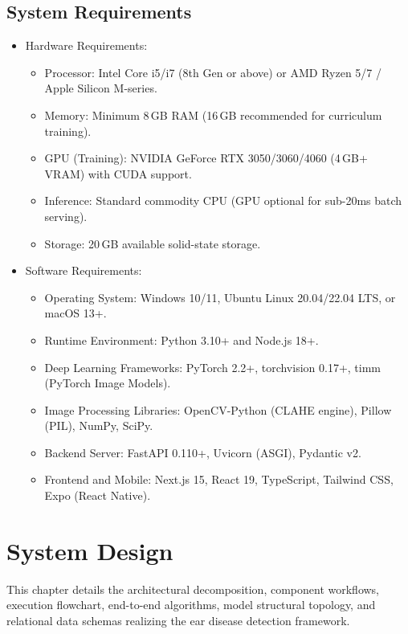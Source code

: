 \documentclass[12pt,a4paper]{report}
\renewcommand{\textbf}[1]{#1}
\begin{document}
\clearpage
\section{System Requirements}
\begin{itemize}
    \item \textbf{Hardware Requirements:}
    \begin{itemize}
        \item Processor: Intel Core i5/i7 (8th Gen or above) or AMD Ryzen 5/7 / Apple Silicon M-series.
        \item Memory: Minimum 8\,GB RAM (16\,GB recommended for curriculum training).
        \item GPU (Training): NVIDIA GeForce RTX 3050/3060/4060 (4\,GB+ VRAM) with CUDA support.
        \item Inference: Standard commodity CPU (GPU optional for sub-20ms batch serving).
        \item Storage: 20\,GB available solid-state storage.
    \end{itemize}
    \item \textbf{Software Requirements:}
    \begin{itemize}
        \item Operating System: Windows 10/11, Ubuntu Linux 20.04/22.04 LTS, or macOS 13+.
        \item Runtime Environment: Python 3.10+ and Node.js 18+.
        \item Deep Learning Frameworks: PyTorch 2.2+, torchvision 0.17+, timm (PyTorch Image Models).
        \item Image Processing Libraries: OpenCV-Python (CLAHE engine), Pillow (PIL), NumPy, SciPy.
        \item Backend Server: FastAPI 0.110+, Uvicorn (ASGI), Pydantic v2.
        \item Frontend and Mobile: Next.js 15, React 19, TypeScript, Tailwind CSS, Expo (React Native).
    \end{itemize}
\end{itemize}


\chapter{System Design}

This chapter details the architectural decomposition, component workflows, execution flowchart, end-to-end algorithms, model structural topology, and relational data schemas realizing the ear disease detection framework.
\end{document}
